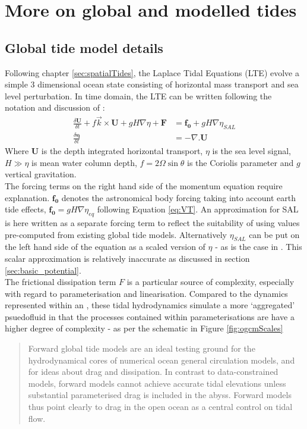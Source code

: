 \chapter{More on global and modelled tides}
\label{appendix:globalTides}
\section{Global tide model details}
Following chapter \ref{sec:spatialTides}, the Laplace Tidal Equations (LTE) evolve a simple 3 dimensional ocean state consisting of horizontal mass transport and sea level perturbation. In time domain, the LTE can be written following the notation and discussion of \cite[pp185]{Egbert:2002ug}:
\begin{align}
    \label{eq:LTE_momtm}
    \frac{\delta \mathbf{U} }{ \delta t} + f\vec{k} \times \mathbf{U} + gH\nabla \eta  + \mathbf{F} &= \mathbf{f_0} + gH \nabla \eta_{SAL} \\
    \label{eq:LTE_cont}
    \frac{\delta \mathbf{\eta} }{\delta t} &= -\nabla.\mathbf{U} 
\end{align}
Where $\mathbf{U}$ is the depth integrated horizontal transport, $\eta$ is the sea level signal, $H \gg \eta$ is mean water column depth, $f=2\Omega\sin\theta$ is the Coriolis parameter and $g$ vertical gravitation.\\
The forcing terms on the right hand side of the momentum equation \label{E:LTE_momtm} require explanation.  
$\mathbf{f_0}$ denotes the astronomical body forcing taking into account earth tide effects, $\mathbf{f_0} = gH\nabla\eta_{eq}$ following Equation \ref{eq:VT}.  
An approximation for SAL is here written as a separate forcing term to reflect the suitability of using values pre-computed from existing global tide models.   
Alternatively $\eta_{SAL}$ can be put on the left hand side of the equation as a scaled version of $\eta$ - as is the case in \MOM{}.   
This scalar approximation is relatively inaccurate as discussed in section \ref{sec:basic_potential}.\\
The frictional dissipation term $F$ is a particular source of complexity, especially with regard to parameterisation and linearisation.
Compared to the dynamics represented within an \OGCM{}, these tidal hydrodynamics simulate a more `aggregated' psuedofluid in that the processes contained within parameterisations are have a higher degree of complexity - as per the schematic in Figure \ref{fig:ogcmScales}
\begin{quotation}
Forward global tide models are an ideal testing ground for the hydrodynamical cores of numerical ocean general circulation models, and for ideas about drag and dissipation. In contrast to data-constrained models, forward models cannot achieve accurate tidal elevations unless substantial parameterised drag is included in the abyss. Forward models thus point clearly to drag in the open ocean as a central control on tidal flow.\citep{Arbic:2004wz}
\end{quotation} 
